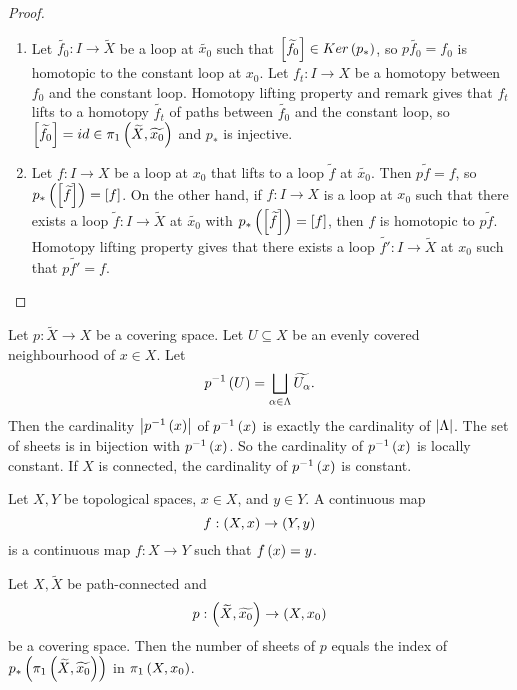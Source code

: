 \begin{proof}
\hfill
\begin{enumerate}
\item Let $ \widetilde{f_0} : I \to \widetilde{X} $ be a loop at $ \widetilde{x_0} $ such that $ \left[ \widetilde{f_0} \right] \in Ker\left( p_* \right) $, so $ p\widetilde{f_0} = f_0 $ is homotopic to the constant loop at $ x_0 $. Let $ f_t : I \to X $ be a homotopy between $ f_0 $ and the constant loop. Homotopy lifting property and remark gives that $ f_t $ lifts to a homotopy $ \widetilde{f_t} $ of paths between $ \widetilde{f_0} $ and the constant loop, so $ \left[ \widetilde{f_0} \right] = id \in \pi_1\left( \widetilde{X}, \widetilde{x_0} \right) $ and $ p_* $ is injective.
\item Let $ f : I \to X $ be a loop at $ x_0 $ that lifts to a loop $ \widetilde{f} $ at $ \widetilde{x_0} $. Then $ p\widetilde{f} = f $, so $ p_*\left( \left[ \widetilde{f} \right] \right) = \left[ f \right] $. On the other hand, if $ f : I \to X $ is a loop at $ x_0 $ such that there exists a loop $ \widetilde{f} : I \to \widetilde{X} $ at $ \widetilde{x_0} $ with $ p_*\left( \left[ \widetilde{f} \right] \right) = \left[ f \right] $, then $ f $ is homotopic to $ p\widetilde{f} $. Homotopy lifting property gives that there exists a loop $ \widetilde{f'} : I \to \widetilde{X} $ at $ x_0 $ such that $ p\widetilde{f'} = f $.
\end{enumerate}
\end{proof}

\pagebreak


Let $ p : \widetilde{X} \to X $ be a covering space. Let $ U \subseteq X $ be an evenly covered neighbourhood of $ x \in X $. Let
$$ p^{-1}\left( U \right) = \bigsqcup_{\alpha \in \Lambda} \widetilde{U_\alpha}. $$
Then the cardinality $ \left\lvert p^{-1}\left( x \right) \right\rvert $ of $ p^{-1}\left( x \right) $ is exactly the cardinality of $ \left\lvert \Lambda \right\rvert $. The set of sheets is in bijection with $ p^{-1}\left( x \right) $. So the cardinality of $ p^{-1}\left( x \right) $ is locally constant. If $ X $ is connected, the cardinality of $ p^{-1}\left( x \right) $ is constant.

\begin{notation*}
Let $ X, Y $ be topological spaces, $ x \in X $, and $ y \in Y $. A continuous map
$$ f : \left( X, x \right) \to \left( Y, y \right) $$
is a continuous map $ f : X \to Y $ such that $ f\left( x \right) = y $.
\end{notation*}

\begin{proposition}
Let $ X, \widetilde{X} $ be path-connected and
$$ p : \left( \widetilde{X}, \widetilde{x_0} \right) \to \left( X, x_0 \right) $$
be a covering space. Then the number of sheets of $ p $ equals the index of $ p_*\left( \pi_1\left( \widetilde{X}, \widetilde{x_0} \right) \right) $ in $ \pi_1\left( X, x_0 \right) $.
\end{proposition}

